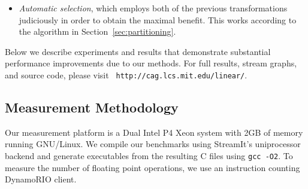 \documentclass{sig-alternate}
\begin{document}
{\begin{itemize}
\item {\it Automatic selection}, which employs both of the previous
transformations judiciously in order to obtain the maximal benefit.
This works according to the algorithm in
Section~\ref{sec:partitioning}.
\end{itemize}
Below we describe experiments and results that demonstrate substantial
performance improvements due to our methods.  For full results, stream
graphs, and source code, please visit {\tt
http://cag.lcs.mit.edu/linear/}.

\subsection{Measurement Methodology}



Our measurement platform is a Dual Intel P4 Xeon system with 2GB of
memory running GNU/Linux.  We compile our benchmarks using StreamIt's
uniprocessor backend and generate executables from the resulting C
files using {\tt gcc -O2}.  To measure the number of floating point
operations, we use an instruction counting DynamoRIO\cite{dynamo99}
client.

}
\end{document}
